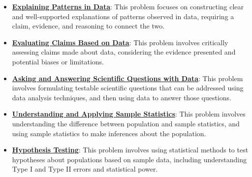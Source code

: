 \documentclass{article}%
\begin{document}
\begin{itemize}[leftmargin=*]%
\item \href{https://purdue.brightspace.com/d2l/common/assets/pdfjs-d2l-dist/1.0.14-legacy/web/viewer.html?file=\%2Fcontent\%2Fenforced\%2F1095465-WL.202510.CS24200.LE1\%2F13L2-hypothesis.pdf\%3Fou\%3D1095465\&lang=en-us\&container=d2l-fileviewer-rendered-pdf\&fullscreen=d2l-fileviewer-rendered-pdf-dialog\&height=667#page=3}{\textbf{Explaining Patterns in Data}}: This problem focuses on constructing clear and well-supported explanations of patterns observed in data, requiring a claim, evidence, and reasoning to connect the two.%
\item \href{https://purdue.brightspace.com/d2l/common/assets/pdfjs-d2l-dist/1.0.14-legacy/web/viewer.html?file=\%2Fcontent\%2Fenforced\%2F1095465-WL.202510.CS24200.LE1\%2F13L2-hypothesis.pdf\%3Fou\%3D1095465\&lang=en-us\&container=d2l-fileviewer-rendered-pdf\&fullscreen=d2l-fileviewer-rendered-pdf-dialog\&height=667#page=4}{\textbf{Evaluating Claims Based on Data}}: This problem involves critically assessing claims made about data, considering the evidence presented and potential biases or limitations.%
\item \href{https://purdue.brightspace.com/d2l/common/assets/pdfjs-d2l-dist/1.0.14-legacy/web/viewer.html?file=\%2Fcontent\%2Fenforced\%2F1095465-WL.202510.CS24200.LE1\%2F13L2-hypothesis.pdf\%3Fou\%3D1095465\&lang=en-us\&container=d2l-fileviewer-rendered-pdf\&fullscreen=d2l-fileviewer-rendered-pdf-dialog\&height=667#page=10}{\textbf{Asking and Answering Scientific Questions with Data}}: This problem involves formulating testable scientific questions that can be addressed using data analysis techniques, and then using data to answer those questions.%
\item \href{https://purdue.brightspace.com/d2l/common/assets/pdfjs-d2l-dist/1.0.14-legacy/web/viewer.html?file=\%2Fcontent\%2Fenforced\%2F1095465-WL.202510.CS24200.LE1\%2F13L2-hypothesis.pdf\%3Fou\%3D1095465\&lang=en-us\&container=d2l-fileviewer-rendered-pdf\&fullscreen=d2l-fileviewer-rendered-pdf-dialog\&height=667#page=11}{\textbf{Understanding and Applying Sample Statistics}}: This problem involves understanding the difference between population and sample statistics, and using sample statistics to make inferences about the population.%
\item \href{https://purdue.brightspace.com/d2l/common/assets/pdfjs-d2l-dist/1.0.14-legacy/web/viewer.html?file=\%2Fcontent\%2Fenforced\%2F1095465-WL.202510.CS24200.LE1\%2F13L2-hypothesis.pdf\%3Fou\%3D1095465\&lang=en-us\&container=d2l-fileviewer-rendered-pdf\&fullscreen=d2l-fileviewer-rendered-pdf-dialog\&height=667#page=12}{\textbf{Hypothesis Testing}}: This problem involves using statistical methods to test hypotheses about populations based on sample data, including understanding Type I and Type II errors and statistical power.%

\end{itemize}
\end{document}
